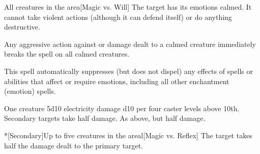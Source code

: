 \begin{spellheader}
\end{spellheader}
\begin{spelleffects}
    \begin{spelltargets}{All creatures in the area}[Magic vs. Will]
        \spellsuccess The target has its emotions calmed. It cannot take violent actions (although it can defend itself) or do anything destructive.
    \end{spelltargets}
\end{spelleffects}
\begin{spellfooter}
    \spellnotes Any aggressive action against or damage dealt to a calmed creature immediately breaks the spell on all calmed creatures.

    This spell automatically suppresses (but does not dispel) any effects of spells or abilities that affect or require emotions, including all other enchantment (emotion) spells.
\end{spellfooter}

\begin{spellheader}
    \spellrng{\rngmed}
\end{spellheader}
\begin{spelleffects}
    \begin{spelltarget}[Primary]{One creature}
        \spellsuccess 5d10 electricity damage \add d10 per four caster levels above 10th. Secondary targets take half damage.
        \spellfailure As above, but half damage.
    \end{spelltarget}
    \begin{spelltargets}*[Secondary]{Up to five creatures in the area}l[Magic vs. Reflex]
        \spellsuccess The target takes half the damage dealt to the primary target.
    \end{spelltargets}
\end{spelleffects}
\begin{spellfooter}
    
\end{spellfooter}

